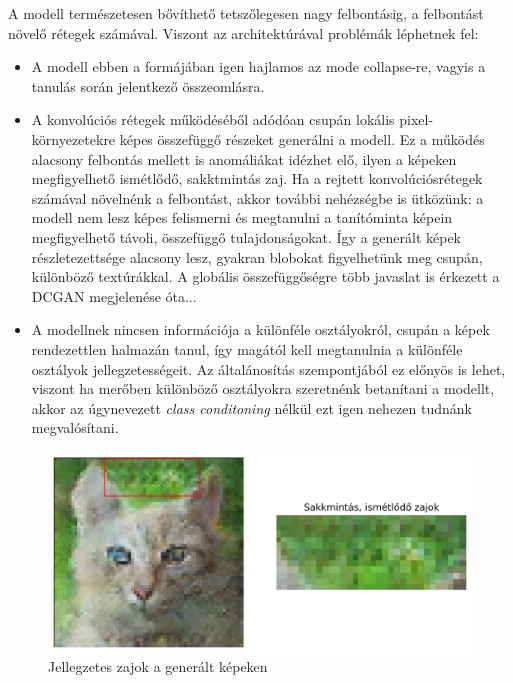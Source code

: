 A modell természetesen bővíthető tetszőlegesen nagy felbontásig, a felbontást növelő rétegek számával. Viszont az architektúrával problémák léphetnek fel:
\begin{itemize}
	\item A modell ebben a formájában igen hajlamos az mode collapse-re, vagyis a tanulás során jelentkező összeomlásra.
	\item A konvolúciós rétegek működéséből adódóan csupán lokális pixel-környezetekre képes összefüggő részeket generálni a modell.
	Ez a működés alacsony felbontás mellett is anomáliákat idézhet elő, ilyen a képeken megfigyelhető ismétlődő, sakktmintás zaj. Ha a rejtett konvolúciósrétegek számával növelnénk a felbontást, akkor további nehézségbe is ütközünk: a modell nem lesz képes felismerni és megtanulni a tanítóminta képein megfigyelhető távoli, összefüggő tulajdonságokat. Így a generált képek részletezettsége alacsony lesz, gyakran blobokat figyelhetünk meg csupán, különböző textúrákkal. A globális összefüggőségre több javaslat is érkezett a DCGAN megjelenése óta...
	\item A modellnek nincsen információja a különféle osztályokról, csupán a képek rendezettlen halmazán tanul, így magától kell megtanulnia a különféle osztályok jellegzetességeit.
	Az általánosítás szempontjából ez előnyös is lehet, viszont ha merőben különböző osztályokra szeretnénk betanítani a modellt, akkor az úgynevezett \textit{class conditoning} nélkül ezt igen nehezen tudnánk megvalósítani.
\end{itemize}


\begin{figure}[h]
\centering
\includegraphics[width=13cm]{images/chessboard-patterns.png}
\caption{Jellegzetes zajok a generált képeken}
\label{fig:chessboard-patterns}
\end{figure}

